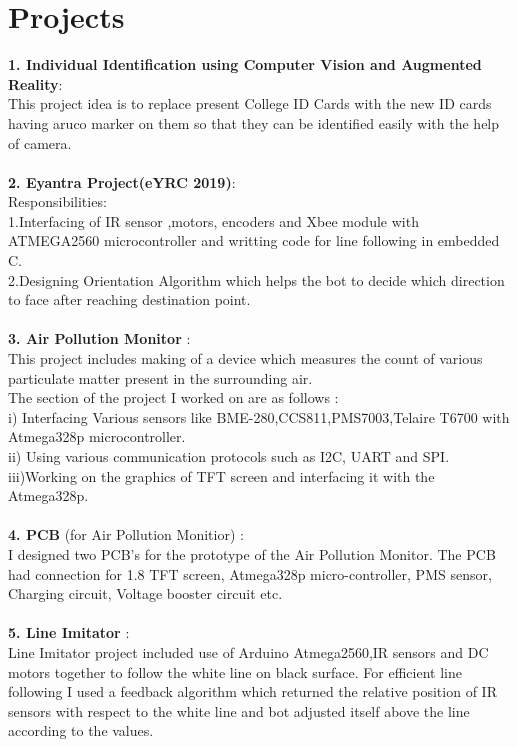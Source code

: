 \documentclass[11pt]{article}
\begin{document}
\section{Projects}
\textbf{1. Individual Identification using Computer Vision and Augmented Reality}:\\
This project idea is to replace present College ID Cards with the new ID cards having aruco marker on them so that they can be identified easily with the help of camera.\\\\
\textbf{2. Eyantra Project(eYRC 2019)}:\\
 Responsibilities:\\
1.Interfacing of IR sensor ,motors, encoders and Xbee module with ATMEGA2560 microcontroller and writting code for line following in embedded C.\\
2.Designing Orientation Algorithm which helps the bot to decide which direction to face after reaching destination point.\\\\
\textbf{3. Air Pollution Monitor} :\\
 This project includes making of a device which measures the count of various particulate matter  present in the surrounding air.\\
The section of the project I worked on are as follows :\\
i)  Interfacing Various sensors like BME-280,CCS811,PMS7003,Telaire T6700 with Atmega328p microcontroller.\\
ii) Using various communication protocols such as I2C, UART and SPI.\\
iii)Working on the graphics of TFT screen and interfacing it with the Atmega328p.\\\\
\textbf{4. PCB }(for Air Pollution Monitior) :\\
I designed two PCB's for the prototype of the Air Pollution Monitor. The PCB had connection for 1.8 TFT screen, Atmega328p micro-controller, PMS sensor, Charging circuit, Voltage booster circuit etc.\\\\
\textbf{5. Line Imitator} :\\
Line Imitator project included use of Arduino Atmega2560,IR sensors and DC motors together to follow the white line on black surface. For efficient line following I used a feedback algorithm which returned the relative position of IR sensors with respect to the white line and bot adjusted itself above the line according to the values.\\\\
\end{document}

